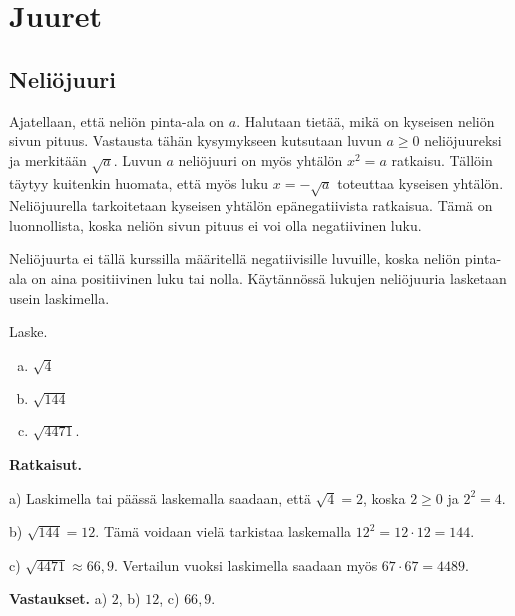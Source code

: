 \chapter{Juuret}

\section{Neliöjuuri}

Ajatellaan, että neliön pinta-ala on $a$. Halutaan tietää, mikä on kyseisen neliön sivun pituus. Vastausta tähän kysymykseen kutsutaan luvun $a\ge 0$ neliöjuureksi ja merkitään $\sqrt{a}$. Luvun $a$ neliöjuuri on myös yhtälön $x^2 = a$ ratkaisu. Tällöin täytyy kuitenkin huomata, että myös luku $x=-\sqrt{a}$ toteuttaa kyseisen yhtälön. Neliöjuurella tarkoitetaan kyseisen yhtälön epänegatiivista ratkaisua. Tämä on luonnollista, koska neliön sivun pituus ei voi olla negatiivinen luku.


Neliöjuurta ei tällä kurssilla määritellä negatiivisille luvuille, koska neliön pinta-ala on aina positiivinen luku tai nolla. Käytännössä lukujen neliöjuuria lasketaan usein laskimella.


\begin{esimerkki}
Laske.
\begin{enumerate}[a)]
\item $\sqrt{4}$

\item $\sqrt{144}$

\item $\sqrt{4471}$.
\end{enumerate}

{\bf Ratkaisut.}

a)
Laskimella tai päässä laskemalla saadaan, että $\sqrt{4} = 2$, koska $2\geq0$ ja $2^2 =4$.

b) 
$\sqrt{144}=12$. Tämä voidaan vielä tarkistaa laskemalla $12^2 = 12\cdot 12=144$.

c)
$\sqrt{4471}\approx 66,9$. Vertailun vuoksi laskimella saadaan myös $67\cdot 67=4489$.

{\bf Vastaukset.}
a) $2$, b) $12$, c) $66,9$.

\end{esimerkki}

